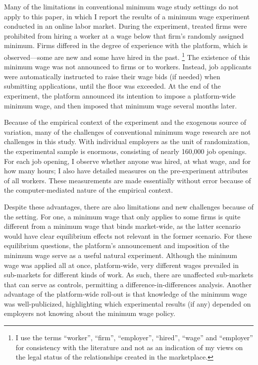 \documentclass[AER]{AEA}
\begin{document}
Many of the limitations in conventional minimum wage study settings do not apply to this paper, in which I report the results of a minimum wage experiment conducted in an online labor market.
During the experiment, treated firms were prohibited from hiring a worker at a wage below that firm's randomly assigned minimum.
Firms differed in the degree of experience with the platform, which is observed---some are new and some have hired in the past. 
\footnote{
  I use the terms ``worker'', ``firm'', ``employer'', ``hired'', ``wage'' and ``employer'' for consistency with the literature and not as an indication of my views on the legal status of the relationships created in the marketplace. 
}  
The existence of this minimum wage was not announced to firms or to workers.
Instead, job applicants were automatically instructed to raise their wage bids (if needed) when submitting applications, until the floor was exceeded.
At the end of the experiment, the platform announced its intention to impose a platform-wide minimum wage, and then imposed that minimum wage several months later.


Because of the empirical context of the experiment and the exogenous source of variation, many of the challenges of conventional minimum wage research are not challenges in this study. 
With individual employers as the unit of randomization, the experimental sample is enormous, consisting of nearly 160,000 job openings.
For each job opening, I observe whether anyone was hired, at what wage, and for how many hours; 
I also have detailed measures on the pre-experiment attributes of all workers. 
These measurements are made essentially without error because of the computer-mediated nature of the empirical context. 

Despite these advantages, there are also limitations and new challenges because of the setting. 
For one, a minimum wage that only applies to some firms is quite different from a minimum wage that binds market-wide, as the latter scenario would have clear equilibrium effects not relevant in the former scenario. 
For these equilibrium questions, the platform's announcement and imposition of the minimum wage serve as a useful natural experiment.
Although the minimum wage was applied all at once, platform-wide, very different wages prevailed in sub-markets for different kinds of work.
As such, there are unaffected sub-markets that can serve as controls, permitting a difference-in-differences analysis.
Another advantage of the platform-wide roll-out is that knowledge of the minimum wage was well-publicized, highlighting which experimental results (if any) depended on employers not knowing about the minimum wage policy.
\end{document}
